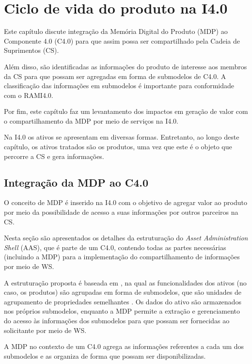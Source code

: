 \chapter{Ciclo de vida do produto na I4.0}
\label{cha:ciclo-de-vida}

Este capítulo discute integração da Memória Digital do Produto (MDP) ao Componente 4.0 (C4.0) para que assim possa ser compartilhado pela Cadeia de Suprimentos (CS).

Além disso, são identificadas as informações do produto de interesse aos membros da CS para que possam ser agregadas em forma de submodelos de C4.0. A classificação das informações em submodelos é importante para conformidade com o RAMI4.0.

Por fim, este capítulo faz um levantamento dos impactos em geração de valor com o compartilhamento da MDP por meio de serviços na I4.0.

Na I4.0 os ativos se apresentam em diversas formas. Entretanto, ao longo deste capítulo, os ativos tratados são os produtos, uma vez que este é o objeto que percorre a CS e gera informações.

\section{Integração da MDP ao C4.0}
\label{sec:estrutura-aas}

O conceito de MDP é inserido na I4.0 com o objetivo de agregar valor ao produto por meio da possibilidade de acesso a suas informações por outros parceiros na CS.

Nesta seção são apresentados os detalhes da estruturação do \textit{Asset Administration Shell} (AAS), que é parte de um C4.0, contendo todas as partes necessárias (incluindo a MDP) para a implementação do compartilhamento de informações por meio de WS.

A estruturação proposta é baseada em , na qual as funcionalidades dos ativos (no caso, os produtos) são agrupadas em forma de submodelos, que são unidades de agrupamento de propriedades semelhantes \cite{bader2019aas, adolph2018roadmap, bedenbender2017aasexamples}. Os dados do ativo são armazenados nos próprios submodelos, enquanto a MDP permite a extração e gerenciamento do acesso às informações dos submodelos para que possam ser fornecidas ao solicitante por meio de WS.

A MDP no contexto de um C4.0 agrega as informações referentes a cada um dos submodelos e as organiza de forma que possam ser disponibilizadas.

